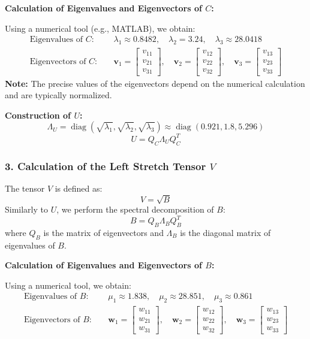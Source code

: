 \documentclass{article}
\begin{document}
\textbf{Calculation of Eigenvalues and Eigenvectors of $ C $:}

Using a numerical tool (e.g., MATLAB), we obtain:
\begin{align*}
    \text{Eigenvalues of } C: \quad & \lambda_1 \approx 0.8482, \quad \lambda_2 = 3.24, \quad \lambda_3 \approx 28.0418 \\
    \text{Eigenvectors of } C: \quad & \bm{v}_1 = \begin{bmatrix} v_{11} \\ v_{21} \\ v_{31} \end{bmatrix}, \quad \bm{v}_2 = \begin{bmatrix} v_{12} \\ v_{22} \\ v_{32} \end{bmatrix}, \quad \bm{v}_3 = \begin{bmatrix} v_{13} \\ v_{23} \\ v_{33} \end{bmatrix}
\end{align*}
\textbf{Note:} The precise values of the eigenvectors depend on the numerical calculation and are typically normalized.

\textbf{Construction of $ U $:}
$$
\Lambda_U = \operatorname{diag}(\sqrt{\lambda_1}, \sqrt{\lambda_2}, \sqrt{\lambda_3}) \approx \operatorname{diag}(0.921, 1.8, 5.296)
$$
$$
U = Q_C \Lambda_U Q_C^T
$$

\subsubsection{3. Calculation of the Left Stretch Tensor $ V $}
The tensor $ V $ is defined as:
$$
V = \sqrt{B}
$$
Similarly to $ U $, we perform the spectral decomposition of $ B $:
$$
B = Q_B \Lambda_B Q_B^T
$$
where $ Q_B $ is the matrix of eigenvectors and $ \Lambda_B $ is the diagonal matrix of eigenvalues of $ B $.

\textbf{Calculation of Eigenvalues and Eigenvectors of $ B $:}

Using a numerical tool, we obtain:
\begin{align*}
\text{Eigenvalues of } B: \quad & \mu_1 \approx 1.838, \quad \mu_2 \approx 28.851, \quad \mu_3 \approx 0.861 \\
\text{Eigenvectors of } B: \quad & \bm{w}_1 = \begin{bmatrix} w_{11} \\ w_{21} \\ w_{31} \end{bmatrix}, \quad \bm{w}_2 = \begin{bmatrix} w_{12} \\ w_{22} \\ w_{32} \end{bmatrix}, \quad \bm{w}_3 = \begin{bmatrix} w_{13} \\ w_{23} \\ w_{33} \end{bmatrix}
\end{align*}
\end{document}
